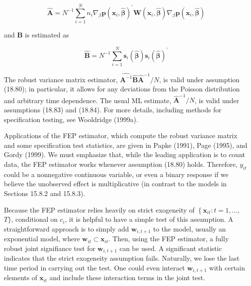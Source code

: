 \documentclass[10pt]{article}
\begin{document}
\begin{equation*}
\hat{\mathbf{A}}=N^{-1} \sum_{i=1}^{N} n_{i} \nabla_{\beta} \mathbf{p}\left(\mathbf{x}_{i}, \hat{\boldsymbol{\beta}}\right)^{\prime} \mathbf{W}\left(\mathbf{x}_{i}, \hat{\boldsymbol{\beta}}\right) \nabla_{\beta} \mathbf{p}\left(\mathbf{x}_{i}, \hat{\boldsymbol{\beta}}\right) \tag{18.92}
\end{equation*}


and $\mathbf{B}$ is estimated as


\begin{equation*}
\hat{\mathbf{B}}=N^{-1} \sum_{i=1}^{N} \mathbf{s}_{i}(\hat{\boldsymbol{\beta}}) \mathbf{s}_{i}(\hat{\boldsymbol{\beta}})^{\prime} \tag{18.93}
\end{equation*}


The robust variance matrix estimator, $\hat{\mathbf{A}^{-1}} \hat{\mathbf{B}} \hat{\mathbf{A}}^{-1} / N$, is valid under assumption (18.80); in particular, it allows for any deviations from the Poisson distribution and arbitrary time dependence. The usual ML estimate, $\hat{\mathbf{A}}^{-1} / N$, is valid under assumptions (18.83) and (18.84). For more details, including methods for specification testing, see Wooldridge (1999a).

Applications of the FEP estimator, which compute the robust variance matrix and some specification test statistics, are given in Papke (1991), Page (1995), and Gordy (1999). We must emphasize that, while the leading application is to count data, the FEP estimator works whenever assumption (18.80) holds. Therefore, $y_{i t}$ could be a nonnegative continuous variable, or even a binary response if we believe the unobserved effect is multiplicative (in contrast to the models in Sections 15.8.2 and 15.8.3).

Because the FEP estimator relies heavily on strict exogeneity of $\left\{\mathbf{x}_{i t}: t=1, \ldots\right.$, $T\}$, conditional on $c_{i}$, it is helpful to have a simple test of this assumption. A straightforward approach is to simply add $\mathbf{w}_{i, t+1}$ to the model, usually an exponential model, where $\mathbf{w}_{i t} \subset \mathbf{x}_{i t}$. Then, using the FEP estimator, a fully robust joint signifiance test for $\mathbf{w}_{i, t+1}$ can be used. A significant statistic indicates that the strict exogeneity assumption fails. Naturally, we lose the last time period in carrying out the test. One could even interact $\mathbf{w}_{i, t+1}$ with certain elements of $\mathbf{x}_{i t}$ and include these interaction terms in the joint test.
\end{document}
